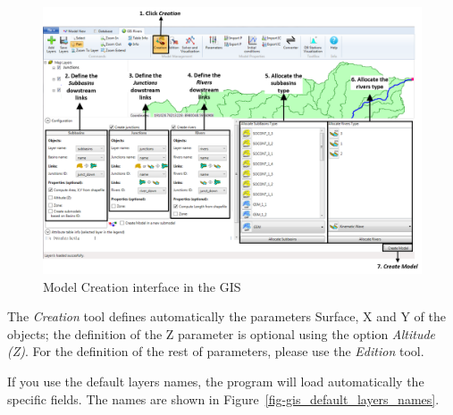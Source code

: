 \documentclass[
  letterpaper,
  DIV=11,
  numbers=noendperiod]{scrreprt}
\begin{document}
\begin{figure}

{\centering \includegraphics{./figures/fig-gis_creation_interface.png}

}

\caption{\label{fig-gis_creation_interface}Model Creation interface in
the GIS}

\end{figure}

\begin{tcolorbox}[standard jigsaw,left=2mm, arc=.35mm, toprule=.15mm, colbacktitle=quarto-callout-important-color!10!white, coltitle=black, leftrule=.75mm, bottomtitle=1mm, colframe=quarto-callout-important-color-frame, colback=white, toptitle=1mm, titlerule=0mm, rightrule=.15mm, title=\textcolor{quarto-callout-important-color}{\faExclamation}\hspace{0.5em}{Important}, bottomrule=.15mm, opacityback=0, opacitybacktitle=0.6]
The \emph{Creation} tool defines automatically the parameters Surface, X
and Y of the objects; the definition of the Z parameter is optional
using the option \emph{Altitude (Z)}. For the definition of the rest of
parameters, please use the \emph{Edition} tool.
\end{tcolorbox}

If you use the default layers names, the program will load automatically
the specific fields. The names are shown in
Figure~\ref{fig-gis_default_layers_names}.
\end{document}
